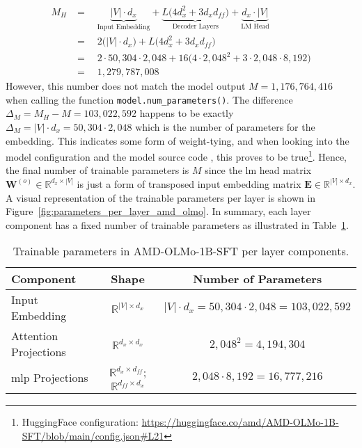 \begin{align*}
    M_H &=\quad \underbrace{|V| \cdot d_x}_{\text{Input Embedding}} 
    + \underbrace{L \big( 4 d_x^2 + 3 d_x d_{ff} \big)}_{\text{Decoder Layers}}
    + \underbrace{d_x \cdot |V|}_{\text{LM Head}} \\
    &=\quad 2 \bigl( |V| \cdot d_x \bigr)
    + L \big( 4 d_x^2 + 3 d_x d_{ff} \big) \\
    &=\quad 2 \cdot 50{,}304 \cdot 2{,}048 + 16 \bigl(4 \cdot 2{,}048^2 + 3 \cdot 2{,}048 \cdot 8{,}192 \bigr) \\
    &=\quad 1{,}279{,}787{,}008
\end{align*}
However, this number does not match the model output $M = 1{,}176{,}764{,}416$ when calling the function \texttt{model.num\_parameters()}. The difference $\Delta_M = M_H - M = 103{,}022{,}592$ happens to be exactly $\Delta_M = |V| \cdot d_x = 50{,}304 \cdot 2{,}048$ which is the number of parameters for the embedding. This indicates some form of weight-tying, and when looking into the model configuration and the model source code \cite{Groeneveld2023OLMo}, this proves to be true\footnote{HuggingFace configuration: \url{https://huggingface.co/amd/AMD-OLMo-1B-SFT/blob/main/config.json\#L21}}. Hence, the final number of trainable parameters is $M$ since the \acrshort{lm} head matrix $\mathbf{W}^{(o)} \in \mathbb{R}^{d_x \times |V|}$ is just a form of transposed input embedding matrix $\mathbf{E} \in \mathbb{R}^{|V| \times d_x}$. A visual representation of the trainable parameters per layer is shown in Figure~\ref{fig:parameters_per_layer_amd_olmo}. In summary, each layer component has a fixed number of trainable parameters as illustrated in Table~\ref{tab:parameter_components_olmo}.
\begin{table}[htb]
    \centering
    \begin{tabular}{|l|c|c|}
        \hline
        \textbf{Component} & \textbf{Shape} & \textbf{Number of Parameters} \\
        \hline
        Input Embedding & $\mathbb{R}^{|V| \times d_x}$ & $|V| \cdot d_x = 50{,}304 \cdot 2{,}048 = 103{,}022{,}592$ \\
        Attention Projections & $\mathbb{R}^{d_x \times d_x}$ & $2{,}048^2 = 4{,}194{,}304$ \\
        \acrshort{mlp} Projections & $\mathbb{R}^{d_x \times d_{ff}}$; $\mathbb{R}^{d_{ff} \times d_x}$ & $2{,}048 \cdot 8{,}192 = 16{,}777{,}216$ \\
        \hline
    \end{tabular}
    \caption{Trainable parameters in AMD-OLMo-1B-SFT per layer components.}
    \label{tab:parameter_components_olmo}
\end{table}


